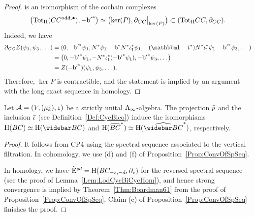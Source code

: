 \documentclass[\MainFolder/Text.tex]{subfiles}
\begin{document}
\begin{proof}
is an isomorphism of the cochain complexes
$$ \bigl(\TotII(\LodCycBi^{\mathrm{odd},\bullet}),-{\Hd'}^*\bigr) \simeq \bigl(\ker(P),\Restr{\Bdd_{\LodCycBi}}{\ker(P)}\bigr) \subset (\TotII\LodCycBi,\Bdd_{\LodCycBi}). $$
Indeed, we have 
\begin{align*}
 \Bdd_{\LodCycBi}Z(\psi_1,\psi_3,\dotsc) &= (0,-{\Hd'}^*\psi_1, \CountOp^*\psi_1 - \Hd^*\CountOp^*\InsOneOp_1^*\psi_1, -(\Id-\CycPermOp^*)\CountOp^*\InsOneOp_1^*\psi_1 - {\Hd'}^*\psi_3, \dotsc ) \\
  &= \bigl(0,-{\Hd'}^*\psi_1,-\CountOp^*\InsOneOp_1^*(-{\Hd'}^*\psi_1), -{\Hd'}^*\psi_3,\dotsc\bigr) \\
  & = Z(-{\Hd'}^*)(\psi_1,\psi_3,\dotsc).
\end{align*}
Therefore, $\ker P$ is contractible, and the statement is implied by an argument with the long exact sequence in homology.
\end{proof}


\begin{Lemma}\label{Lem:ConNormVer}
Let $\Alg=(V,(\mu_k),\NOne)$ be a strictly unital $\mathrm{A}_\infty$-algebra. The projection $\bar{p}$ and the inclusion $\bar{\iota}$ (see Definition~\ref{Def:CycBico}) induce the isomorphisms $\H(\ConCycBi) \simeq \H(\NConCycBi)$ and $\H(\widehat{\ConCycBi}^*)\simeq\H(\widehat{\NConCycBi}^*)$, respectively.
\end{Lemma}
\begin{proof}
It follows from CP4 using the spectral sequence associated to the vertical filtration. In cohomology, we use (d) and (f) of Proposition~\ref{Prop:ConvOfSpSeq}.

In homology, we have $\tilde{\mathrm{E}}^{sd} = \mathrm{H}(BC_{-s,-d},\partial_{\mathrm{v}})$ for the reversed spectral sequence (see the proof of Lemma~\ref{Lem:LodCycBiCycHom}), and hence strong convergence is implied by Theorem~\ref{Thm:Boardman61} from the proof of Proposition~\ref{Prop:ConvOfSpSeq}. Claim (e) of Proposition~\ref{Prop:ConvOfSpSeq} finishes the proof.
\end{proof}
\end{document}
